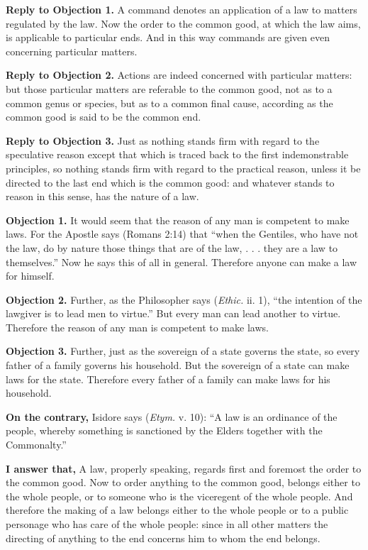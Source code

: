 \textbf{Reply to Objection 1.} A command denotes an application of a law to matters regulated by the law. Now the order to the common good, at which the law aims, is applicable to particular ends. And in this way commands are given even concerning particular matters.

\textbf{Reply to Objection 2.} Actions are indeed concerned with particular matters: but those particular matters are referable to the common good, not as to a common genus or species, but as to a common final cause, according as the common good is said to be the common end.

\textbf{Reply to Objection 3.} Just as nothing stands firm with regard to the speculative reason except that which is traced back to the first indemonstrable principles, so nothing stands firm with regard to the practical reason, unless it be directed to the last end which is the common good: and whatever stands to reason in this sense, has the nature of a law.


\textbf{Objection 1.} It would seem that the reason of any man is competent to make laws. For the Apostle says (Romans 2:14) that ``when the Gentiles, who have not the law, do by nature those things that are of the law, . . . they are a law to themselves.'' Now he says this of all in general. Therefore anyone can make a law for himself.

\textbf{Objection 2.} Further, as the Philosopher says (\emph{Ethic.} ii. 1), ``the intention of the lawgiver is to lead men to virtue.'' But every man can lead another to virtue. Therefore the reason of any man is competent to make laws.

\textbf{Objection 3.} Further, just as the sovereign of a state governs the state, so every father of a family governs his household. But the sovereign of a state can make laws for the state. Therefore every father of a family can make laws for his household.

\textbf{On the contrary,} Isidore says (\emph{Etym.} v. 10): ``A law is an ordinance of the people, whereby something is sanctioned by the Elders together with the Commonalty.''

\textbf{I answer that,} A law, properly speaking, regards first and foremost the order to the common good. Now to order anything to the common good, belongs either to the whole people, or to someone who is the viceregent of the whole people. And therefore the making of a law belongs either to the whole people or to a public personage who has care of the whole people: since in all other matters the directing of anything to the end concerns him to whom the end belongs.

